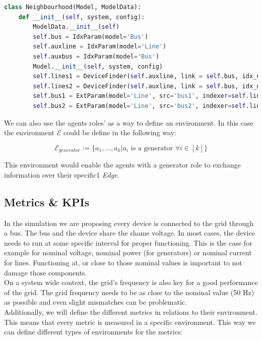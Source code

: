 \documentclass{report}
\begin{document}
\begin{lstlisting}[language=Python, basicstyle=\small, breaklines=true]
class Neighbourhood(Model, ModelData):
    def __init__(self, system, config):
        ModelData.__init__(self)
        self.bus = IdxParam(model='Bus')
        self.auxline = IdxParam(model='Line')
        self.auxbus = IdxParam(model='Bus')
        Model.__init__(self, system, config)
        self.lines1 = DeviceFinder(self.auxline, link = self.bus, idx_name ='bus1')
        self.lines2 = DeviceFinder(self.auxline, link = self.bus, idx_name ='bus2')
        self.bus1 = ExtParam(model='Line', src='bus1', indexer=self.lines2)
        self.bus2 = ExtParam(model='Line', src='bus2', indexer=self.lines1)
\end{lstlisting}

We can also use the agents roles' as a way to define an environment. In this case the environment $\mathcal{E}$ could be define in the following way:

\begin{equation}\label{environment}
    \mathcal{E}_{generator}:= \{ a_1, ..., a_k | a_i \text{ is a generator } \forall i \in [k] \}
\end{equation}

This environment would enable the agents with a generator role to exchange information over their specific1 \textit{Edge}. 

\subsection{Metrics \& KPIs}

In the simulation we are proposing every device is connected to the grid through a bus. The bus and the device share the shame voltage. In most cases, the device needs to run at some specific interval for proper functioning. This is the case for example for nominal voltage, nominal power (for generators) or nominal current for lines. Functioning at, or close to those nominal values is important to not damage those components.\\

On a system wide context, the grid's frequency is also key for a good performance of the grid. The grid frequency needs to be as close to the nominal value (50 Hz) as possible and even slight mismatches can be problematic. \\

Additionally, we will define the different metrics in relations to their environment. This means that every metric is measured in a specific environment. This way we can define different types of environments for the metrics:
\end{document}
